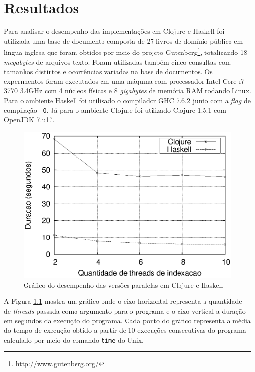 \chapter{Resultados}

Para analisar o desempenho das implementações em Clojure e Haskell foi utilizada uma base de documento composta de 27 livros de domínio público em lingua inglesa que foram obtidos por meio do projeto Gutenberg\footnote{http://www.gutenberg.org/}, totalizando 18 \emph{megabytes} de arquivos texto. Foram utilizadas também cinco consultas com tamanhos distintos e ocorrências variadas na base de documentos. Os experimentos foram executados em uma máquina com processador Intel Core i7-3770 3.4GHz com 4 núcleos físicos e 8 \emph{gigabytes} de memória RAM rodando Linux. Para o ambiente Haskell foi utilizado o compilador GHC 7.6.2 junto com a \emph{flag} de compilação \verb|-O|. Já para o ambiente Clojure foi utilizado Clojure 1.5.1 com OpenJDK 7.u17.

\begin{figure}[h]
 \centering
 \includegraphics[scale=0.85]{imagens/clojure-haskell.eps}
 \caption{Gráfico do desempenho das versões paralelas em Clojure e Haskell}
 \label{fig:clj-hs-comp}
\end{figure}

A Figura \ref{fig:clj-hs-comp} mostra um gráfico onde o eixo horizontal representa a quantidade de \emph{threads} passada como argumento para o programa e o eixo vertical a duração em segundos da execução do programa. Cada ponto do gráfico representa a média do tempo de execução obtido a partir de 10 execuções consecutivas do programa calculado por meio do comando \verb|time| do Unix.


